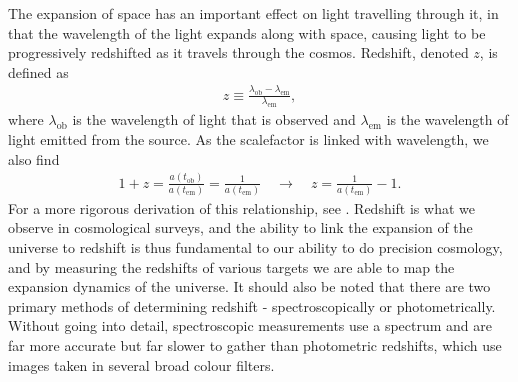 \documentclass[titlesmallcaps, examinerscopy, copyrightpage]{uqthesis}
\begin{document}
The expansion of space has an important effect on light travelling through it, in that the wavelength of the light expands along with space, causing light to be progressively redshifted as it travels through the cosmos. Redshift, denoted $z$, is defined as 
\begin{align}
z \equiv \frac{\lambda_{\text{ob}} - \lambda_{\text{em}}}{\lambda_{\text{em}}},
\end{align}
where $\lambda_{\text{ob}}$ is the wavelength of light that is observed and $\lambda_{\text{em}}$ is the wavelength of light emitted from the source. As the scalefactor is linked with wavelength, we also find
\begin{align}
1 + z = \frac{a(t_{\text{ob}})}{a(t_{\text{em}})} = \frac{1}{a(t_{\text{em}})} \quad\rightarrow \quad z = \frac{1}{a(t_{\text{em}})} - 1.
\end{align}
For a more rigorous derivation of this relationship, see \citet[Ch 3.4]{RydenPartridge2004}. Redshift is what we observe in cosmological surveys, and the ability to link the expansion of the universe to redshift is thus fundamental to our ability to do precision cosmology, and by measuring the redshifts of various targets we are able to map the expansion dynamics of the universe. It should also be noted that there are two primary methods of determining redshift - spectroscopically or photometrically. Without going into detail, spectroscopic measurements use a spectrum and are far more accurate but far slower to gather than photometric redshifts, which use images taken in several broad colour filters.
\end{document}
